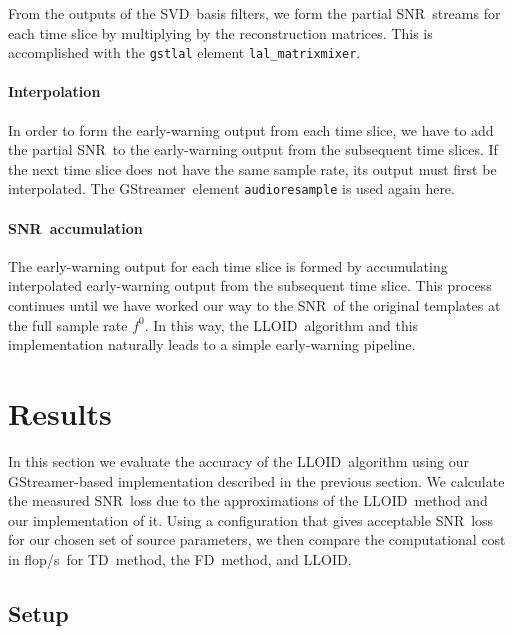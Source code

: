 \documentclass[preprint2]{aastex}
\newcommand{\SNR}{SNR}%
\newcommand{\SVD}{SVD}%
\newcommand{\flops}{flop/s}
\newcommand{\gstreamer}{GStreamer}
\newcommand{\lloid}{LLOID}%
\newcommand{\TD}{TD}%
\newcommand{\FD}{FD}%
\begin{document}
From the outputs of the \SVD\ basis filters, we form the partial \SNR\ streams
for each time  slice by multiplying by the reconstruction matrices.  This is
accomplished with the \texttt{gstlal} element \texttt{lal\_matrixmixer}.

\paragraph{Interpolation}

In order to form the early-warning output from each time slice, we have to add
the partial \SNR\ to the early-warning output from the subsequent time slices.
If the next time slice does not have the same sample rate, its output must first
be interpolated.  The \gstreamer\ element \texttt{audioresample} is used again here.  

\paragraph{\SNR\ accumulation}

The early-warning output for each time slice is formed by accumulating
interpolated early-warning output from the subsequent time slice.  This process
continues until we have worked our way to the \SNR\ of the original templates
at the full sample rate $f^0$.  In this way, the \lloid\ algorithm and this
implementation naturally leads to a simple early-warning pipeline.

\section{Results}

In this section we evaluate the accuracy of the \lloid\ algorithm using our 
\gstreamer{}-based implementation described in the previous section. We calculate
the measured \SNR\ loss due to the approximations of the \lloid\ method and our
implementation of it. Using a configuration that gives acceptable \SNR\ loss
for our chosen set of source parameters, we then compare the computational cost
in \flops\ for \TD\ method, the \FD\ method, and \lloid.

\subsection{Setup}
\label{sec:bank-setup}
\end{document}
